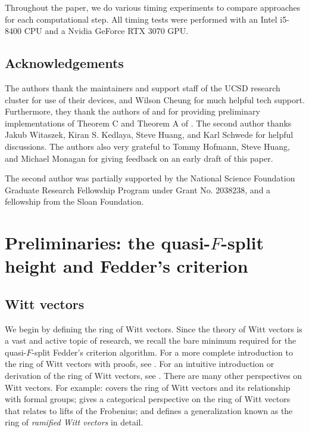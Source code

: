 \documentclass[a4paper]{article}
\theoremstyle{definition}
\theoremstyle{remark}
\begin{document}
Throughout the paper, we do various timing experiments to compare 
approaches for each computational step.
All timing tests were performed with 
an Intel i5-8400 CPU and a Nvidia GeForce RTX 3070 GPU.

\subsection{Acknowledgements}

The authors thank the maintainers and support staff 
of the UCSD research cluster for use of their devices,
and Wilson Cheung for much helpful tech support.
Furthermore, they thank the authors of 
\cite{kty-2022-fedder} 
and \cite{fgmqt-2025-witt-vectors-macaulay2}
for providing preliminary implementations of 
Theorem C and Theorem A
of \cite{kty-2022-fedder}.
The second author thanks Jakub Witaszek, Kiran S. Kedlaya,
Steve Huang, and Karl Schwede for helpful discussions.
The authors also very grateful to 
Tommy Hofmann, Steve Huang, and 
Michael Monagan for giving feedback on an early draft of
this paper.

The second author was partially supported by the 
National Science Foundation Graduate Research
Fellowship Program under Grant No. 2038238, and a fellowship
from the Sloan Foundation.


\section{Preliminaries: the quasi-\(F\)-split height and Fedder's criterion}


\subsection{Witt vectors}

We begin by defining the ring of Witt vectors. 
Since the theory of Witt vectors is a vast and active topic of research,
we recall the bare minimum 
required for the quasi-\(F\)-split Fedder's criterion algorithm.
For a more complete introduction to the ring of Witt vectors with proofs, 
see \cite{rabinoff-2014-witt-vec}.
For an intuitive introduction or derivation of the ring of Witt vectors, see
\cite{kim-2017-witt-vec}.
There are many other perspectives on Witt vectors. 
For example:
\cite[Chapter~17]{hazewinkel-1978-formal-groups} covers the ring of Witt vectors
and its relationship with formal groups; 
\cite{kedlaya-2021-prismatic} gives a categorical perspective on the ring of Witt vectors
that relates to lifts of the Frobenius; and
\cite[Chapter~1]{schneider-2017-galois-rep-phi-gamma} defines a generalization
known as the ring of \textit{ramified Witt vectors} in detail.
\end{document}
